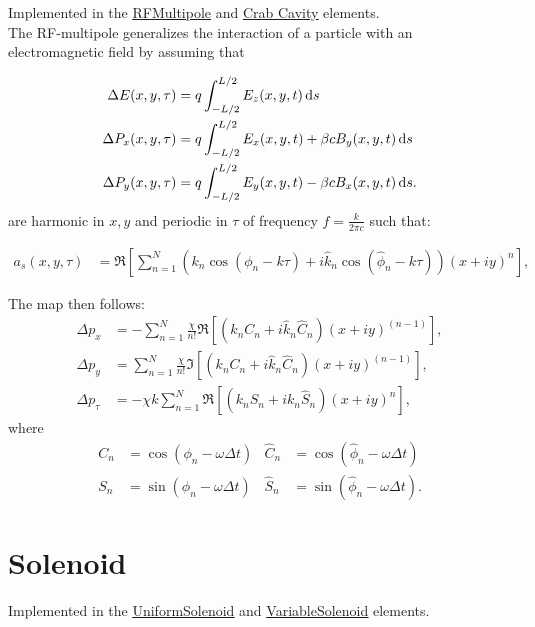 Implemented in the \href{https://xsuite.readthedocs.io/en/latest/apireference.html#rfmultipole}{\underline{RFMultipole}}
and \href{https://xsuite.readthedocs.io/en/latest/apireference.html#crabcavity}{\underline{Crab Cavity}} elements.
~\\

The RF-multipole generalizes the interaction of a particle with an electromagnetic field by assuming that

\begin{align}
\Delta E(x,y,\tau) &= q \int_{-L/2}^{L/2} E_z(x,y,t)  {\rm \,d}s \\
\Delta P_x(x,y,\tau) &= q \int_{-L/2}^{L/2} E_x(x,y,t) + \beta c B_y(x,y,t) {\rm \,d}s\\
\Delta P_y(x,y,\tau) &= q \int_{-L/2}^{L/2} E_y(x,y,t) - \beta c B_x(x,y,t) {\rm \,d}s.
\end{align}
are harmonic in $x,y$ and periodic in $\tau$ of frequency $f=\frac{k}{2\pi c}$ such that:

\begin{align}
a_s(x,y,\tau)
&= \Re \left[ \sum_{n=1}^N
      \left(       k_n \cos(\phi_n -k \tau ) +
            i \hat k_n \cos(\hat \phi_n -k \tau)
      \right)
      (x+i y )^n
     \right],
\end{align}

The map then follows:
\begin{align}
    \Delta p_x &= -\sum_{n=1}^N \frac{\chi}{n!} \Re\left[ (k_n C_n + i \hat k_n \hat C_n)(x+iy)^{(n-1)}\right], \\
    \Delta p_y &=  \sum_{n=1}^N \frac{\chi}{n!} \Im\left[ (k_n C_n + i \hat k_n \hat C_n)(x+iy)^{(n-1)}\right], \\
    \Delta p_\tau &= -\chi k \sum_{n=1}^N \Re\left[( k_n S_n + i k_n \hat S_n ) (x+iy)^n\right],
\end{align}
where
\begin{align}
     C_n&=\cos(\phi_n-\omega \Delta t) &
\hat C_n&=\cos(\hat \phi_n-\omega \Delta t) \\
     S_n&=\sin(\phi_n-\omega \Delta t) &
\hat S_n&=\sin(\hat \phi_n-\omega \Delta t) .
\end{align}


\section{Solenoid}

Implemented in the \href{https://xsuite.readthedocs.io/en/latest/apireference.html#uniformsolenoid}{\underline{UniformSolenoid}}
and \href{https://xsuite.readthedocs.io/en/latest/apireference.html#variablesolenoid}{\underline{VariableSolenoid}} elements.
~\\

